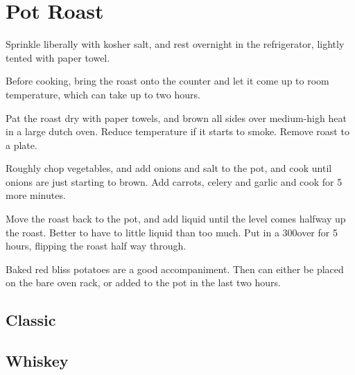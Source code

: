 \section{Pot Roast}
\begin{recipe}



Sprinkle liberally with kosher salt, and rest overnight in the refrigerator, lightly tented with paper towel.

Before cooking, bring the roast onto the counter and let it come up to room temperature, which can take up to two hours.

Pat the roast dry with paper towels, and brown all sides over medium-high heat in a large dutch oven. Reduce temperature if it starts to smoke. Remove roast to a plate.


Roughly chop vegetables, and add onions and salt to the pot, and cook until onions are just starting to brown. Add carrots, celery and garlic and cook for 5 more minutes.

Move the roast back to the pot, and add liquid until the level comes halfway up the roast. Better to have to little liquid than too much. Put in a 300\degree over for 5 hours, flipping the roast half way through.

Baked red bliss potatoes are a good accompaniment. Then can either be placed on the bare oven rack, or added to the pot in the last two hours.

\subsection{Classic}



\subsection{Whiskey}


\end{recipe}
